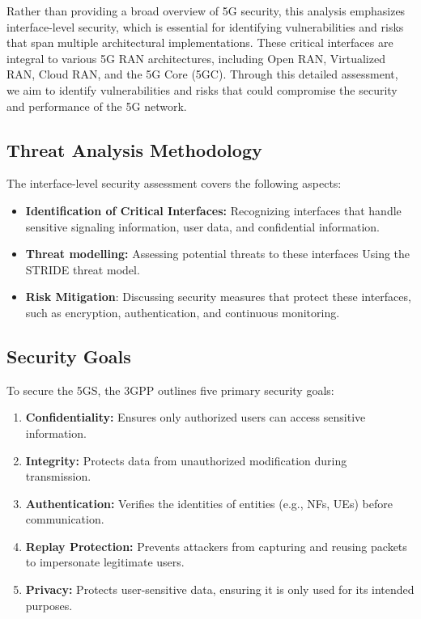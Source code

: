 \documentclass{report}
\begin{document}
Rather than providing a broad overview of 5G security, this analysis
emphasizes interface-level security, which is essential for identifying vulnerabilities and risks that span multiple architectural implementations. These critical interfaces are integral to various 5G RAN architectures, including Open RAN, Virtualized RAN, Cloud RAN, and the 5G Core (5GC). Through this detailed assessment, we aim to identify vulnerabilities and risks that could compromise the security and performance of the 5G network.


\subsection{Threat Analysis Methodology}
The interface-level security assessment covers the following aspects:
\begin{itemize}
    \item \textbf{Identification of Critical Interfaces:} Recognizing interfaces that handle sensitive signaling information, user data, and confidential information.
    \item \textbf{Threat modelling: }Assessing potential threats to these interfaces Using the STRIDE threat model.
    \item \textbf{Risk Mitigation}: Discussing security measures that protect these interfaces, such as encryption, authentication, and continuous monitoring.
\end{itemize}

\subsection{Security Goals}
To secure the 5GS, the 3GPP outlines five primary security goals:\cite{mahyoub2024security}
\begin{enumerate}
    \item \textbf{Confidentiality:} Ensures only authorized users can access sensitive information. 
    \item \textbf{Integrity:} Protects data from unauthorized modification during transmission.
    \item \textbf{Authentication:} Verifies the identities of entities (e.g., NFs, UEs) before communication.
    \item \textbf{Replay Protection:} Prevents attackers from capturing and reusing packets to impersonate legitimate users.
    \item \textbf{Privacy:} Protects user-sensitive data, ensuring it is only used for its intended purposes.
    
\end{enumerate}
\end{document}
